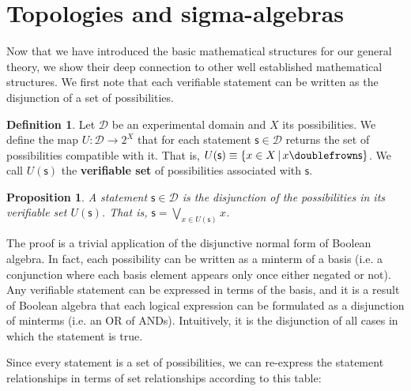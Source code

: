 \documentclass[letterpaper]{article}
\theoremstyle{plain}%
\newtheorem{prop}[thrm]{Proposition}
\theoremstyle{definition}
\newtheorem{defn}[thrm]{Definition}
\theoremstyle{remark}
\numberwithin{equation}{section}
\def\comp{\doublefrown}
\def\bigOR{\bigvee}
\newcommand{\obs}[1][s] {\mathsf{#1}}
\newcommand{\edomain}[1][D] {\mathcal{#1}}
\begin{document}
\section{Topologies and sigma-algebras}

Now that we have introduced the basic mathematical structures for our general theory, we show their deep connection to other well established mathematical structures. We first note that each verifiable statement can be written as the disjunction of a set of possibilities.

\begin{defn}
	Let $\edomain$ be an experimental domain and $X$ its possibilities. We define the map $U : \edomain \rightarrow 2^X$ that for each statement $\obs \in \edomain$ returns the set of possibilities compatible with it. That is, $U(\obs)\equiv\{ x \in X \, | \, x \comp \obs\}$. We call $U(\obs)$ the \textbf{verifiable set} of possibilities associated with $\obs$.
\end{defn}

\begin{prop}
	A statement $\obs \in \edomain$ is the disjunction of the possibilities in its verifiable set $U(\obs)$. That is, $\obs=\bigOR\limits_{x \in U(\obs)} x$.
\end{prop}

The proof is a trivial application of the disjunctive normal form of Boolean algebra. In fact, each possibility can be written as a minterm of a basis (i.e. a conjunction where each basis element appears only once either negated or not). Any verifiable statement can be expressed in terms of the basis, and it is a result of Boolean algebra that each logical expression can be formulated as a disjunction of minterms (i.e. an OR of ANDs). Intuitively, it is the disjunction of all cases in which the statement is true.

Since every statement is a set of possibilities, we can re-express the statement relationships in terms of set relationships according to this table:
\end{document}
